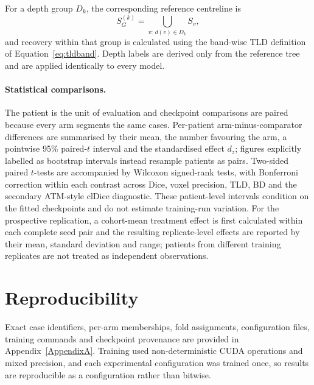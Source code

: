 For a depth group $D_k$, the corresponding reference centreline is
\begin{equation}
  S_G^{(k)}
  =
  \bigcup_{v:\,d(v)\in D_k} S_v,
\end{equation}
and recovery within that group is calculated using the band-wise TLD definition of
Equation~\eqref{eq:tldband}. Depth labels are derived only from the reference tree and are
applied identically to every model.

\paragraph{Statistical comparisons.}
The patient is the unit of evaluation and checkpoint comparisons are paired because every arm
segments the same cases. Per-patient arm-minus-comparator differences are summarised by their
mean, the number favouring the arm, a pointwise 95\% paired-$t$ interval and the standardised
effect $d_z$; figures explicitly labelled as bootstrap intervals instead resample patients as
pairs. Two-sided paired $t$-tests are accompanied by Wilcoxon signed-rank tests, with
Bonferroni correction within each contrast across Dice, voxel precision, TLD, BD and the
secondary ATM-style clDice diagnostic. These patient-level intervals condition on the fitted
checkpoints and do not estimate training-run variation. For the prospective replication, a
cohort-mean treatment effect is first calculated within each complete seed pair and the
resulting replicate-level effects are reported by their mean, standard deviation and range;
patients from different training replicates are not treated as independent observations.

\section{Reproducibility}

Exact case identifiers, per-arm memberships, fold assignments, configuration files, training
commands and checkpoint provenance are provided in Appendix~\ref{AppendixA}. Training used
non-deterministic CUDA operations and mixed precision, and each experimental configuration was
trained once, so results are reproducible as a configuration rather than bitwise.
